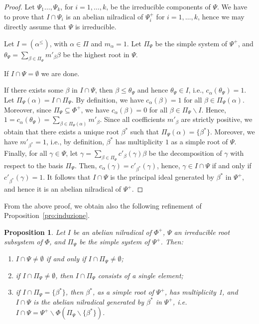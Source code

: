 \documentclass[10pt]{amsart}
\newtheorem{pro}[thm]{Proposition}
\theoremstyle{definition}
\theoremstyle{remark}
\newcommand\smeno{\smallsetminus}
\newcommand\al{\alpha}
\newcommand\be{\beta}
\newcommand\ga{\gamma}
\renewcommand{\leq}{\leqslant}
\begin{document}
\begin{proof}
Let $\Psi_1\dots, \Psi_k$,  for $i=1, \dots, k$, be the irreducible components of $\Psi$.
We have to prove that $I\cap \Psi_i$ is an abelian nilradical of $\Psi_i^+$ for $i=1, \dots, k$, hence we may directly assume 
that $\Psi$ is irreducible.
\par
Let $I=(\al^\leq) $, with $\al\in \Pi$ and $m_\al=1$.  
Let $\Pi_{\Psi}$ be the simple system of $\Psi^+$, and $\theta_\Psi=\sum_{\be\in \Pi_\Psi}m'_\be\be$ be the highest root in $\Psi$. 

\par
If $I\cap \Psi=\emptyset$  we are done.

\par
If there exists some $\be$ in $I\cap \Psi$, then $\be\leq \theta_\Psi$ and hence $\theta_\Psi\in I$, i.e., $c_\al(\theta_\Psi)=1$. Let $\Pi_\Psi(\al)=I\cap \Pi_\Psi$. 
By definition, we have $c_\al(\be)=1$ for all $\be\in \Pi_\Psi(\al)$.
Moreover, since $\Pi_{\Psi}\subseteq \Phi^+$, we have $c_\al(\be)=0$ for all $\be\in \Pi_{\Psi}\smeno I$. 
Hence,  $1=c_\al(\theta_\Psi)=\sum_{\be\in\Pi_{\Psi}(\al)} m'_\be$.
Since all coefficients $m'_\be$ are strictly positive, we obtain that there exists a unique root $\be^*$ such that  $\Pi_{\Psi}(\al)=\{\be^*\}$. 
Moreover, we have $m'_{\be^*}=1$, i.e.,  by definition, $\be^*$ has multiplicity $1$ as a simple root of $\Psi$.
Finally, for all $\ga\in \Psi$, let $\ga=\sum_{\be\in \Pi_\Psi}c'_\be(\ga)\be$ be the decomposition of $\ga$ with respect to the basis $\Pi_\Psi$. 
Then, $c_\al(\ga)=c'_{\be^*}(\ga)$, hence, $\ga\in I\cap\Psi$ if and only if $c'_{\be^*}(\ga)=1$.
It follows that $I\cap\Psi$ is the principal ideal generated by $\be^*$ in $\Psi^+$, and hence it is an abelian nilradical of $\Psi^+$.
\end{proof}

From the above proof, we obtain also the following refinement of Proposition~\ref{pro:induzione}. 

\begin{pro}\label{pro:induzione-fine}
Let $I$ be an abelian nilradical of $\Phi^+$, $\Psi$ an irreducible root subsystem of $\Phi$, and $\Pi_\Psi$ be the simple system of $\Psi^+$. Then:
\begin{enumerate}
\item 
$I\cap \Psi\neq \emptyset$ if and only if $I\cap \Pi_\Psi\neq \emptyset$; 
\label{itm:nonvuoto}
\item 
if $I\cap \Pi_\Psi\neq \emptyset$, then $I\cap \Pi_\Psi$  consists of a single element;
\label{itm:singleton}
\item
if $I\cap\Pi_\Psi=\{\beta^*\}$, then $\beta^*$, as a simple root of $\Psi^+$, has multiplicity 1, and $I\cap \Psi$ is the abelian nilradical generated by $\beta^*$ in $\Psi^+$, i.e. $I\cap \Psi=\Psi^+\smeno \Phi(\Pi_\Psi\smeno\{\beta^*\})$.
\label{itm:nilradical}
\end{enumerate}
\end{pro}
\end{document}
